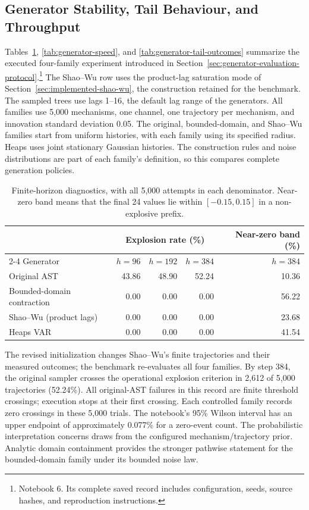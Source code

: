 \subsection{Generator Stability, Tail Behaviour, and Throughput}
\label{sec:implemented-generator-results}

Tables~\ref{tab:generator-outcomes}, \ref{tab:generator-speed}, and
\ref{tab:generator-tail-outcomes} summarize
the executed four-family experiment introduced in
Section~\ref{sec:generator-evaluation-protocol}.\footnote{Notebook 6. Its
complete saved record includes configuration, seeds, source hashes, and
reproduction instructions.}
The Shao--Wu row uses the product-lag saturation mode of
Section~\ref{sec:implemented-shao-wu}, the construction retained for the
benchmark. The sampled trees use lags 1--16, the default lag range of the
generators.
All families use 5,000 mechanisms, one channel, one trajectory per mechanism,
and innovation standard deviation 0.05. The original, bounded-domain, and
Shao--Wu families start from uniform histories, with each family using its
specified radius. Heaps uses joint stationary Gaussian histories. The construction rules and
noise distributions are part of each family's definition, so this compares
complete generation policies.

\begin{table}[H]
\centering\small
\begin{tabular}{@{}lrrrr@{}}
\toprule
& \multicolumn{3}{c}{Explosion rate (\%)} & Near-zero band (\%) \\
\cmidrule(lr){2-4}
Generator & $h=96$ & $h=192$ & $h=384$ & $h=384$ \\
\midrule
Original AST & 43.86 & 48.90 & 52.24 & 10.36 \\
Bounded-domain contraction & 0.00 & 0.00 & 0.00 & 56.22 \\
Shao--Wu (product lags) & 0.00 & 0.00 & 0.00 & 23.68 \\
Heaps VAR & 0.00 & 0.00 & 0.00 & 41.54 \\
\bottomrule
\end{tabular}
\caption{Finite-horizon diagnostics, with all 5,000 attempts in each
denominator. Near-zero band means that the final 24 values lie within
$[-0.15,0.15]$ in a non-explosive prefix.}
\label{tab:generator-outcomes}
\end{table}

The revised initialization changes Shao--Wu's finite trajectories and their
measured outcomes; the benchmark re-evaluates all four families.
By step 384, the original sampler crosses the operational explosion criterion
in 2,612 of 5,000 trajectories (52.24\%).
All original-AST failures in this record are finite threshold crossings;
execution stops at their first crossing. Each controlled
family records zero crossings in these 5,000 trials. The notebook's 95\%
Wilson interval has an upper endpoint of approximately 0.077\% for a
zero-event count. The probabilistic interpretation concerns draws from the
configured mechanism/trajectory prior. Analytic domain containment provides
the stronger pathwise statement for the bounded-domain family under its
bounded noise law.

